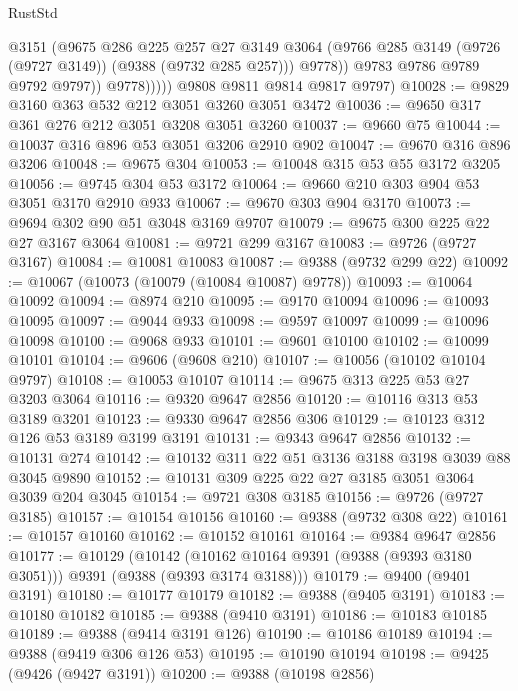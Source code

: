 \begin{lexlean}{RustStd}
\begin{coremodule}
                      @3151
                      (@9675
                        @286
                        @225
                        @257
                        @27
                        @3149
                        @3064
                        (@9766 @285 @3149 (@9726 (@9727 @3149)) (@9388 (@9732 @285 @257)))
                        @9778))
                    @9783
                    @9786
                    @9789
                    @9792
                    @9797))
                @9778)))))
      @9808
      @9811
      @9814
      @9817
      @9797)
@10028 := @9829 @3160 @363 @532 @212 @3051 @3260 @3051 @3472
@10036 := @9650 @317 @361 @276 @212 @3051 @3208 @3051 @3260
@10037 := @9660 @75
@10044 := @10037 @316 @896 @53 @3051 @3206 @2910 @902
@10047 := @9670 @316 @896 @3206
@10048 := @9675 @304
@10053 := @10048 @315 @53 @55 @3172 @3205
@10056 := @9745 @304 @53 @3172
@10064 := @9660 @210 @303 @904 @53 @3051 @3170 @2910 @933
@10067 := @9670 @303 @904 @3170
@10073 := @9694 @302 @90 @51 @3048 @3169 @9707
@10079 := @9675 @300 @225 @22 @27 @3167 @3064
@10081 := @9721 @299 @3167
@10083 := @9726 (@9727 @3167)
@10084 := @10081 @10083
@10087 := @9388 (@9732 @299 @22)
@10092 := @10067 (@10073 (@10079 (@10084 @10087) @9778))
@10093 := @10064 @10092
@10094 := @8974 @210
@10095 := @9170 @10094
@10096 := @10093 @10095
@10097 := @9044 @933
@10098 := @9597 @10097
@10099 := @10096 @10098
@10100 := @9068 @933
@10101 := @9601 @10100
@10102 := @10099 @10101
@10104 := @9606 (@9608 @210)
@10107 := @10056 (@10102 @10104 @9797)
@10108 := @10053 @10107
@10114 := @9675 @313 @225 @53 @27 @3203 @3064
@10116 := @9320 @9647 @2856
@10120 := @10116 @313 @53 @3189 @3201
@10123 := @9330 @9647 @2856 @306
@10129 := @10123 @312 @126 @53 @3189 @3199 @3191
@10131 := @9343 @9647 @2856
@10132 := @10131 @274
@10142 := @10132 @311 @22 @51 @3136 @3188 @3198 @3039 @88 @3045 @9890
@10152 := @10131 @309 @225 @22 @27 @3185 @3051 @3064 @3039 @204 @3045
@10154 := @9721 @308 @3185
@10156 := @9726 (@9727 @3185)
@10157 := @10154 @10156
@10160 := @9388 (@9732 @308 @22)
@10161 := @10157 @10160
@10162 := @10152 @10161
@10164 := @9384 @9647 @2856
@10177 := @10129
    (@10142 (@10162 @10164 @9391 (@9388 (@9393 @3180 @3051))) @9391 (@9388 (@9393 @3174 @3188)))
@10179 := @9400 (@9401 @3191)
@10180 := @10177 @10179
@10182 := @9388 (@9405 @3191)
@10183 := @10180 @10182
@10185 := @9388 (@9410 @3191)
@10186 := @10183 @10185
@10189 := @9388 (@9414 @3191 @126)
@10190 := @10186 @10189
@10194 := @9388 (@9419 @306 @126 @53)
@10195 := @10190 @10194
@10198 := @9425 (@9426 (@9427 @3191))
@10200 := @9388 (@10198 @2856)

\end{coremodule}
\end{lexlean}

